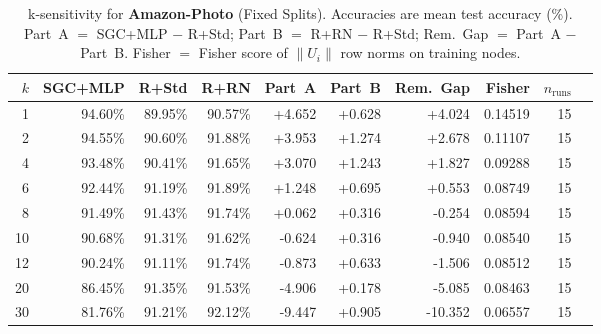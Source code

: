 \begin{table}[t]
\centering\small\setlength{\tabcolsep}{5pt}
\caption{k-sensitivity for \textbf{Amazon-Photo} (Fixed Splits). Accuracies are mean test accuracy (\%). Part~A $=$ SGC+MLP $-$ R+Std; Part~B $=$ R+RN $-$ R+Std; Rem.~Gap $=$ Part~A $-$ Part~B. Fisher $=$ Fisher score of $\|U_i\|$ row norms on training nodes.}
\label{tab:exp8_per_dataset_amazon-photo_fixed}
\begin{tabular}{rrrrrrrrrr}
\toprule
$k$ & SGC+MLP & R+Std & R+RN & Part~A & Part~B & Rem.~Gap & Fisher & $n_{\mathrm{runs}}$ \\
\midrule
1 & 94.60\% & 89.95\% & 90.57\% & +4.652 & +0.628 & +4.024 & 0.14519 & 15 \\
2 & 94.55\% & 90.60\% & 91.88\% & +3.953 & +1.274 & +2.678 & 0.11107 & 15 \\
4 & 93.48\% & 90.41\% & 91.65\% & +3.070 & +1.243 & +1.827 & 0.09288 & 15 \\
6 & 92.44\% & 91.19\% & 91.89\% & +1.248 & +0.695 & +0.553 & 0.08749 & 15 \\
8 & 91.49\% & 91.43\% & 91.74\% & +0.062 & +0.316 & -0.254 & 0.08594 & 15 \\
10 & 90.68\% & 91.31\% & 91.62\% & -0.624 & +0.316 & -0.940 & 0.08540 & 15 \\
12 & 90.24\% & 91.11\% & 91.74\% & -0.873 & +0.633 & -1.506 & 0.08512 & 15 \\
20 & 86.45\% & 91.35\% & 91.53\% & -4.906 & +0.178 & -5.085 & 0.08463 & 15 \\
30 & 81.76\% & 91.21\% & 92.12\% & -9.447 & +0.905 & -10.352 & 0.06557 & 15 \\
\bottomrule
\end{tabular}
\end{table}
